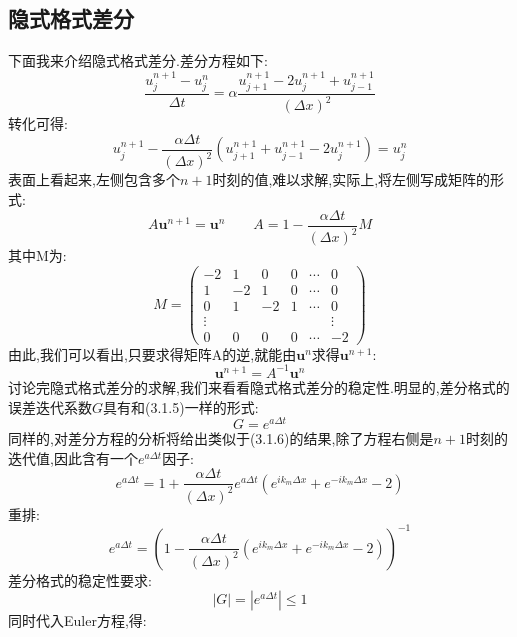\documentclass{article}
\numberwithin{equation}{subsection}
\begin{document}
\subsection{隐式格式差分}
下面我来介绍隐式格式差分.差分方程如下:
\begin{equation}
     \frac{u^{n+1}_j - u^n_j}{\Delta t} = \alpha\frac{u^{n+1}_{j+1}-2u^{n+1}_j + u^{n+1}_{j-1}}{(\Delta x)^2}
\end{equation}
转化可得:
\begin{equation}
    u^{n+1}_j - \frac{\alpha\Delta t}{(\Delta x)^2}(u^{n+1}_{j+1}+u^{n+1}_{j-1}-2u^{n+1}_j) = u^n_j
\end{equation}
表面上看起来,左侧包含多个$n+1$时刻的值,难以求解,实际上,将左侧写成矩阵的形式:
\begin{equation}
A\textbf{u}^{n+1} = \textbf{u}^n\qquad A = 1-\frac{\alpha\Delta t}{(\Delta x)^2}M
\end{equation}
其中M为:
$$M = \begin{pmatrix}
-2&1&0&0&\cdots&0\\
1&-2&1&0&\cdots&0\\
0&1&-2&1&\cdots&0\\
\vdots& & & & &\vdots\\
0&0&0&0&\cdots&-2
\end{pmatrix}$$
由此,我们可以看出,只要求得矩阵A的逆,就能由$\textbf{u}^n$求得$\textbf{u}^{n+1}$:
\begin{equation}
    \mathbf{u}^{n+1} = A^{-1}\mathbf{u}^n
\end{equation}
讨论完隐式格式差分的求解,我们来看看隐式格式差分的稳定性.明显的,差分格式的误差迭代系数$G$具有和(3.1.5)一样的形式:
\begin{equation}
    G = e^{a\Delta t}
\end{equation}
同样的,对差分方程的分析将给出类似于(3.1.6)的结果,除了方程右侧是$n+1$时刻的迭代值,因此含有一个$e^{a\Delta t}$因子:
\begin{equation}
    e^{a\Delta t} = 1+\frac{\alpha \Delta t}{(\Delta x)^2}e^{a\Delta t}\left(e^{i k_{m} \Delta x}+e^{-i k_{m} \Delta x}-2\right)
\end{equation}
重排:
\begin{equation}
    e^{a\Delta t} = \left(1-\frac{\alpha\Delta t}{(\Delta x)^2}\left(e^{i k_{m} \Delta x}+e^{-i k_{m} \Delta x}-2\right)\right)^{-1}
\end{equation}
差分格式的稳定性要求:
\begin{equation}
    |G| = |e^{a\Delta t}|\leq 1
\end{equation}
同时代入Euler方程,得:
\end{document}
